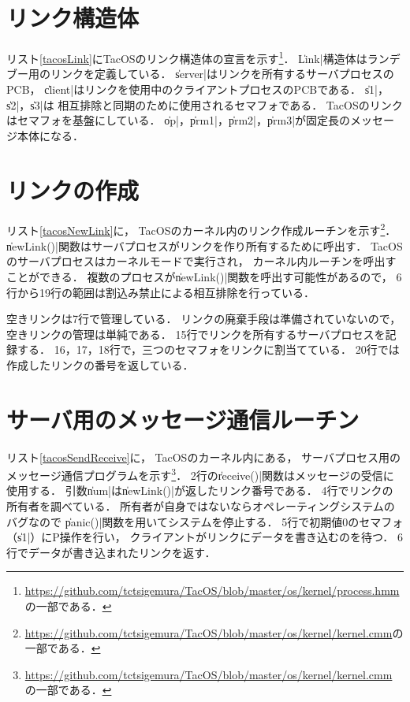 \section{リンク構造体}
リスト\ref{tacosLink}にTacOSのリンク構造体の宣言を示す\footnote{
  \url{https://github.com/tctsigemura/TacOS/blob/master/os/kernel/process.hmm}
  の一部である．}．
\|Link|構造体はランデブー用のリンクを定義している．
\|server|はリンクを所有するサーバプロセスのPCB，
\|client|はリンクを使用中のクライアントプロセスのPCBである．
\|s1|，\|s2|，\|s3|は
相互排除と同期のために使用されるセマフォである．
TacOSのリンクはセマフォを基盤にしている．
\|op|，\|prm1|，\|prm2|，\|prm3|が固定長のメッセージ本体になる．



\section{リンクの作成}
リスト\ref{tacosNewLink}に，
TacOSのカーネル内のリンク作成ルーチンを示す\footnote{
  \url{https://github.com/tctsigemura/TacOS/blob/master/os/kernel/kernel.cmm}の
  一部である．}．
\|newLink()|関数はサーバプロセスがリンクを作り所有するために呼出す．
TacOSのサーバプロセスはカーネルモードで実行され，
カーネル内ルーチンを呼出すことができる．
複数のプロセスが\|newLink()|関数を呼出す可能性があるので，
6行から19行の範囲は割込み禁止による相互排除を行っている．



空きリンクは7行で管理している．
リンクの廃棄手段は準備されていないので，
空きリンクの管理は単純である．
15行でリンクを所有するサーバプロセスを記録する．
16，17，18行で，三つのセマフォをリンクに割当てている．
20行では作成したリンクの番号を返している．

\section{サーバ用のメッセージ通信ルーチン}
リスト\ref{tacosSendReceive}に，
TacOSのカーネル内にある，
サーバプロセス用のメッセージ通信プログラムを示す\footnote{
  \url{https://github.com/tctsigemura/TacOS/blob/master/os/kernel/kernel.cmm}
  の一部である．}．
2行の\|receive()|関数はメッセージの受信に使用する．
引数\|num|は\|newLink()|が返したリンク番号である．
4行でリンクの所有者を調べている．
所有者が自身ではないならオペレーティングシステムのバグなので
\|panic()|関数を用いてシステムを停止する．
5行で初期値0のセマフォ（\|s1|）にP操作を行い，
クライアントがリンクにデータを書き込むのを待つ．
6行でデータが書き込まれたリンクを返す．

